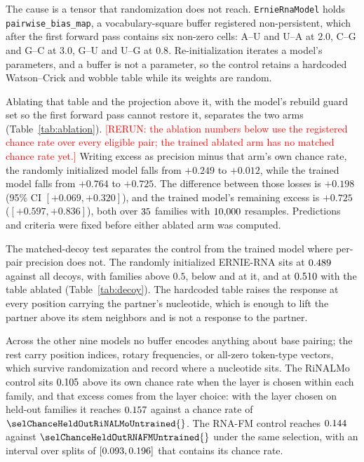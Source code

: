 \documentclass[11pt]{article}
\begin{document}
The cause is a tensor that randomization does not reach.
\texttt{ErnieRnaModel} holds \texttt{pairwise\_bias\_map}, a
vocabulary-square buffer registered non-persistent, which after the first
forward pass contains six non-zero cells: A--U and U--A at $2.0$, C--G and G--C
at $3.0$, G--U and U--G at $0.8$. Re-initialization iterates a model's
parameters, and a buffer is not a parameter, so the control retains a hardcoded
Watson--Crick and wobble table while its weights are random.



Ablating that table and the projection above it, with the model's rebuild guard
set so the first forward pass cannot restore it, separates the two arms
(Table~\ref{tab:ablation}).
\textcolor{red}{[RERUN: the ablation numbers below use the registered chance
rate over every eligible pair; the trained ablated arm has no matched chance
rate yet.]} Writing excess as precision minus that arm's own
chance rate, the randomly initialized model falls from $+0.249$ to $+0.012$,
while the trained model falls from $+0.764$ to $+0.725$. The difference between
those losses is $+0.198$ (95\% CI $[+0.069, +0.320]$), and the trained model's
remaining excess is $+0.725$ ($[+0.597, +0.836]$), both over
$35{}$ families with $10{,}000{}$ resamples. Predictions and
criteria were fixed before either ablated arm was computed.

The matched-decoy test separates the control from the trained model where
per-pair precision does not. The randomly initialized ERNIE-RNA sits at
$0.489{}$ against all decoys, with
\decoyAllAboveErnieRNAUntrained{} families above $0.5$,
\decoyAllBelowErnieRNAUntrained{} below and \decoyAllAtHalfErnieRNAUntrained{}
at it, and at $0.510{}$ with the table ablated
(Table~\ref{tab:decoy}). The hardcoded table raises the response at every
position carrying the partner's nucleotide, which is enough to lift the partner
above its stem neighbors and is not a response to the partner.

Across the other nine models no buffer encodes anything about base pairing;
the rest carry position indices, rotary frequencies, or all-zero token-type
vectors, which survive randomization and record where a nucleotide sits. The
RiNALMo control sits $0.105{}$ above its own chance rate
when the layer is chosen within each family, and that excess comes from the
layer choice: with the layer chosen on held-out families it reaches
$0.157{}$ against a chance rate of
$\selChanceHeldOutRiNALMoUntrained{}$. The RNA-FM control reaches
$0.144{}$ against $\selChanceHeldOutRNAFMUntrained{}$
under the same selection, with an interval over splits of
$[0.093, 0.196]{}$ that contains its chance rate.
\end{document}

